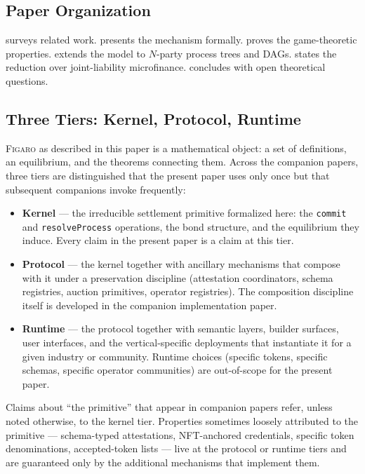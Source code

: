 \documentclass[11pt,a4paper]{article}
\theoremstyle{definition}
\theoremstyle{remark}
\newcommand{\figaro}{\textsc{Figaro}}
\begin{document}
\subsection{Paper Organization}

 surveys related work.  presents
the mechanism formally.  proves the
game-theoretic properties.  extends the model
to $N$-party process trees and DAGs.  states
the reduction over joint-liability microfinance.
 concludes with open theoretical questions.

\subsection{Three Tiers: Kernel, Protocol, Runtime}
\label{sec:three-tiers}
\figaro{} as described in this paper is a mathematical object: a
set of definitions, an equilibrium, and the theorems connecting
them. Across the companion papers, three tiers are distinguished
that the present paper uses only once but that subsequent
companions invoke frequently:

\begin{itemize}
  \item \textbf{Kernel} --- the irreducible settlement primitive
    formalized here: the \texttt{commit} and \texttt{resolveProcess}
    operations, the bond structure, and the equilibrium they
    induce. Every claim in the present paper is a claim at this
    tier.
  \item \textbf{Protocol} --- the kernel together with ancillary
    mechanisms that compose with it under a preservation
    discipline (attestation coordinators, schema registries,
    auction primitives, operator registries). The composition
    discipline itself is developed in the companion implementation
    paper.
  \item \textbf{Runtime} --- the protocol together with semantic
    layers, builder surfaces, user interfaces, and the
    vertical-specific deployments that instantiate it for a given
    industry or community. Runtime choices (specific tokens,
    specific schemas, specific operator communities) are
    out-of-scope for the present paper.
\end{itemize}

Claims about ``the primitive'' that appear in companion papers
refer, unless noted otherwise, to the kernel tier. Properties
sometimes loosely attributed to the primitive --- schema-typed
attestations, NFT-anchored credentials, specific token
denominations, accepted-token lists --- live at the protocol or
runtime tiers and are guaranteed only by the additional
mechanisms that implement them.
\end{document}
